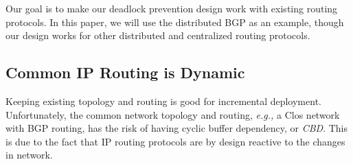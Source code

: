 Our goal is to make our deadlock prevention design work with existing routing protocols. In this paper, we will use the distributed BGP as an example, though our design works for other distributed and centralized routing protocols. 





\subsection{Common IP Routing is Dynamic}\label{sec:reroute}

Keeping existing topology and routing is good for incremental deployment.
Unfortunately, the common network topology and routing, {\em e.g.,} a Clos network~\cite{fat-tree,vl2} with
BGP routing, has the risk of having cyclic buffer dependency, or {\em CBD}.
This is due to the fact that IP routing protocols are by design reactive to the changes in network.

